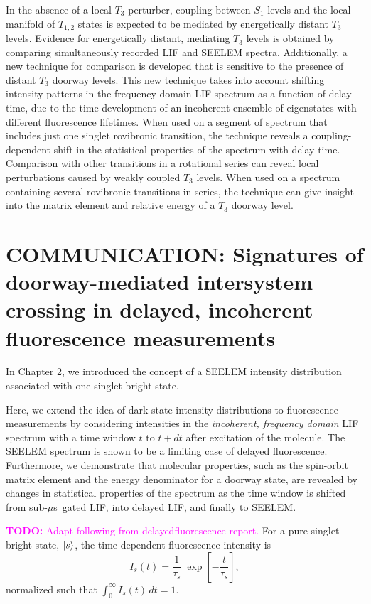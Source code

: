 \documentclass[12pt,draft]{mitthesis}
\newcommand{\TODO} [1]{\textcolor{magenta}{\textbf{TODO:} #1}}
\newcommand{\microsec}{$\mu$s}
\begin{document}
In the absence of a local $T_3$ perturber, coupling between $S_1$
levels and the local manifold of $T_{1,2}$ states is expected to be
mediated by energetically distant $T_3$ levels.  Evidence for
energetically distant, mediating $T_3$ levels is obtained by comparing
simultaneously recorded LIF and SEELEM spectra.  Additionally, a new
technique for comparison is developed that is sensitive to the
presence of distant $T_3$ doorway levels.  This new technique takes
into account shifting intensity patterns in the frequency-domain LIF
spectrum as a function of delay time, due to the time development of
an incoherent ensemble of eigenstates with different fluorescence
lifetimes.  When used on a segment of spectrum that includes just one
singlet rovibronic transition, the technique reveals a
coupling-dependent shift in the statistical properties of the spectrum
with delay time.  Comparison with other transitions in a rotational
series can reveal local perturbations caused by weakly coupled $T_3$
levels.  When used on a spectrum containing several rovibronic
transitions in series, the technique can give insight into the matrix
element and relative energy of a $T_3$ doorway level.

\section{COMMUNICATION: Signatures of doorway-mediated intersystem
  crossing in delayed, incoherent fluorescence measurements}

In Chapter 2, we introduced the concept of a SEELEM intensity
distribution associated with one singlet bright state.  

Here, we extend the idea of dark state intensity distributions to
fluorescence measurements by considering intensities in the
\emph{incoherent, frequency domain} LIF spectrum with a time window
$t$ to $t+dt$ after excitation of the molecule.  The SEELEM spectrum
is shown to be a limiting case of delayed fluorescence.  Furthermore,
we demonstrate that molecular properties, such as the spin-orbit
matrix element and the energy denominator for a doorway state, are
revealed by changes in statistical properties of the spectrum as the
time window is shifted from sub-\microsec\ gated LIF, into delayed
LIF, and finally to SEELEM.

\TODO{Adapt following from delayedfluorescence report.}  For a pure
singlet bright state, $\mathinner{|{s}\rangle}$, the time-dependent fluorescence
intensity is
\begin{equation}
  I_s(t) = \frac{1}{\tau_s} \;
           \exp \left[
             -\frac{t}{ \tau_s} 
           \right],
\end{equation}
normalized such that $\int_0^{\infty} I_s(t) \, dt = 1$.
\end{document}
